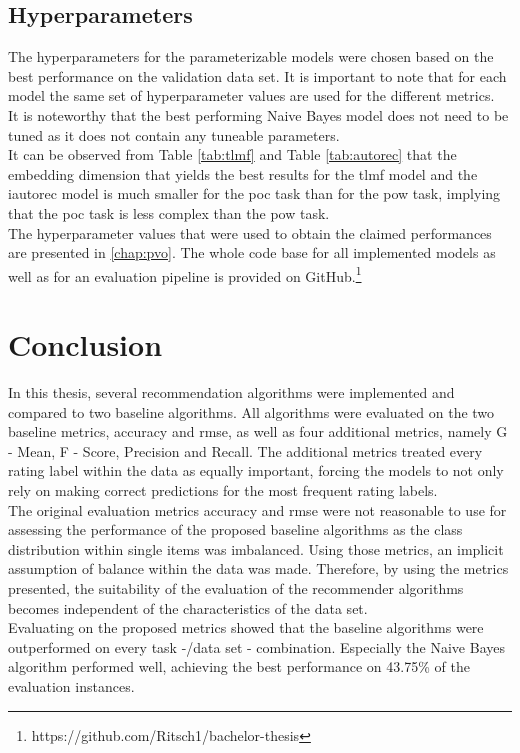 \subsection{Hyperparameters}
\label{chap:hyperparams}
The hyperparameters for the parameterizable models were chosen based on the best performance on the validation data set. It is important to note that for each model the same set of hyperparameter values are used for the different metrics.\\
It is noteworthy that the best performing Naive Bayes model does not need to be tuned as it does not contain any tuneable parameters.\\
It can be observed from Table \ref{tab:tlmf} and Table \ref{tab:autorec} that the embedding dimension that yields the best results for the \acrshort{tlmf} model and the \acrshort{iautorec} model is much smaller for the \acrshort{poc} task than for the \acrshort{pow} task, implying that the \acrshort{poc} task is less complex than the \acrshort{pow} task.\\ 
The hyperparameter values that were used to obtain the claimed performances are presented in \ref{chap:pvo}. The whole code base for all implemented models as well as for an evaluation pipeline is provided on GitHub.\footnote{https://github.com/Ritsch1/bachelor-thesis}  

\section{Conclusion}
\label{chap:conclusion}
In this thesis, several recommendation algorithms were implemented and compared to two baseline algorithms. All algorithms were evaluated on the two baseline metrics, accuracy and rmse, as well as four additional metrics, namely G - Mean, F - Score, Precision and Recall. The additional metrics treated every rating label within the data as equally important, forcing the models to not only rely on making correct predictions for the most frequent rating labels.\\
The original evaluation metrics accuracy and rmse were not reasonable to use for assessing the performance of the proposed baseline algorithms as the class distribution within single items was imbalanced. Using those metrics, an implicit assumption of balance within the data was made. Therefore, by using the metrics presented, the suitability of the evaluation of the recommender algorithms becomes independent of the characteristics of the data set.\\
Evaluating on the proposed metrics showed that the baseline algorithms were outperformed on every task -/data set - combination. Especially the Naive Bayes algorithm performed well, achieving the best performance on 43.75\% of the evaluation instances.

